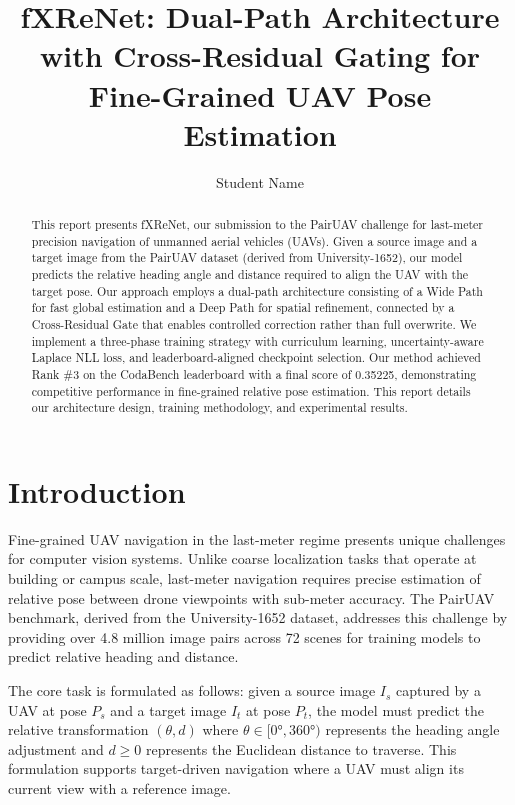 \documentclass[sigconf,nonacm]{acmart}
\begin{document}
\title{fXReNet: Dual-Path Architecture with Cross-Residual Gating for Fine-Grained UAV Pose Estimation}

\author{Student Name}

\begin{abstract}
This report presents fXReNet, our submission to the PairUAV challenge for last-meter precision navigation of unmanned aerial vehicles (UAVs). Given a source image and a target image from the PairUAV dataset (derived from University-1652), our model predicts the relative heading angle and distance required to align the UAV with the target pose. Our approach employs a dual-path architecture consisting of a Wide Path for fast global estimation and a Deep Path for spatial refinement, connected by a Cross-Residual Gate that enables controlled correction rather than full overwrite. We implement a three-phase training strategy with curriculum learning, uncertainty-aware Laplace NLL loss, and leaderboard-aligned checkpoint selection. Our method achieved Rank \#3 on the CodaBench leaderboard with a final score of 0.35225, demonstrating competitive performance in fine-grained relative pose estimation. This report details our architecture design, training methodology, and experimental results.
\end{abstract}

\maketitle

\section{Introduction}

Fine-grained UAV navigation in the last-meter regime presents unique challenges for computer vision systems. Unlike coarse localization tasks that operate at building or campus scale, last-meter navigation requires precise estimation of relative pose between drone viewpoints with sub-meter accuracy. The PairUAV benchmark, derived from the University-1652 dataset, addresses this challenge by providing over 4.8 million image pairs across 72 scenes for training models to predict relative heading and distance.

The core task is formulated as follows: given a source image $I_s$ captured by a UAV at pose $P_s$ and a target image $I_t$ at pose $P_t$, the model must predict the relative transformation $(\theta, d)$ where $\theta \in [0°, 360°)$ represents the heading angle adjustment and $d \geq 0$ represents the Euclidean distance to traverse. This formulation supports target-driven navigation where a UAV must align its current view with a reference image.
\end{document}
